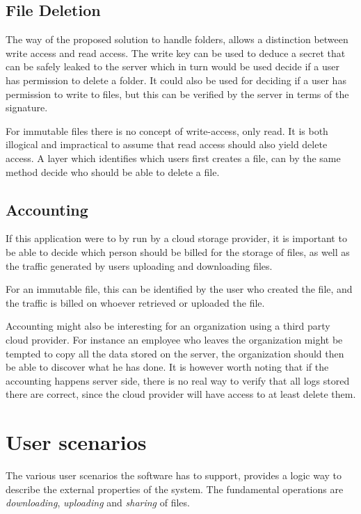 \documentclass[pdftex,english,10pt,b5paper,twoside]{book}
\begin{document}
\subsection{File Deletion}

The way of the proposed solution to handle folders, allows a distinction between write
access and read access. The write key can be used to deduce a secret that can
be safely leaked to the server which in turn would be used decide if a user has
permission to delete a folder. It could also be used for deciding if a user has
permission to write to files, but this can be verified by the server in terms
of the signature.

For immutable files there is no concept of write-access, only read. It is both
illogical and impractical to assume that read access should also yield
delete access. A layer which identifies which users first creates a file, can by
the same method decide who should be able to delete a file. 

\subsection{Accounting}

If this application were to by run by a cloud storage provider, it is
important to be able to decide which person should be billed for the storage of
files, as well as the traffic generated by users uploading and downloading
files. 

For an immutable file, this can be identified by the user who created the file,
and the traffic is billed on whoever retrieved or uploaded the file.

Accounting might also be interesting for an organization using a third party
cloud provider. For instance an employee who leaves the organization might be
tempted to copy all the data stored on the server, the organization should then
be able to discover what he has done. It is however worth noting that if the
accounting happens server side, there is no real way to verify that all logs
stored there are correct, since the cloud provider will have access to at least
delete them.

\section{User scenarios}

The various user scenarios the software has to support, provides a logic way to
describe the external properties of the system. The fundamental operations are
\emph{downloading}, \emph{uploading} and \emph{sharing} of files.
\end{document}
